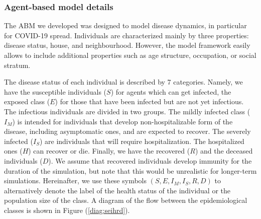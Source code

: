 \documentclass[11pt,a4paper]{article}
\begin{document}
\subsubsection{Agent-based model details} \label{sec:seihrd}

The ABM we developed was designed to model disease dynamics, in particular for COVID-19 spread. Individuals are characterized mainly by three properties: disease status, house, and neighbourhood. However, the model framework easily allows to include additional properties such as age structure, occupation, or social stratum.

The disease status of each individual is described by 7 categories. Namely, we have the susceptible individuals ($S$) for agents which can get infected, the exposed class ($E$) for those that have been infected but are not yet infectious. The infectious individuals are divided in two groups. The mildly infected class ($I_M$) is intended for individuals that develop  non-hospitalizable form of the disease, including asymptomatic ones, and are expected to recover. The severely infected ($I_S$) are individuals that will require hospitalization. The hospitalized ones ($H$) can recover or die. Finally, we have the recovered ($R$) and the deceased individuals ($D$). We assume that recovered individuals develop immunity for the duration of the simulation, but note that this would be unrealistic for longer-term simulations. Hereinafter, we use these symbols $(S, E, I_M, I_S, R, D)$ to alternatively denote the label of the health status of the individual or the population size of the class. A diagram of the flow between the epidemiological classes is shown in Figure (\ref{diag:seihrd}). 
\end{document}
